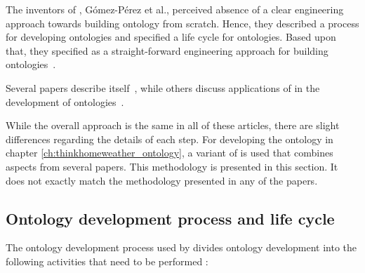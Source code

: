 \vspace{1em}

The inventors of \methontology, Gómez-Pérez et al., perceived absence of a clear engineering approach towards building ontology from scratch. Hence, they described a process for developing ontologies and specified a life cycle for ontologies. Based upon that, they specified \methontology as a straight-forward engineering approach for building ontologies~\cite{Methontology}.

Several papers describe \methontology itself~\cite{Methontology,Methontology2,ORSD}, while others discuss applications of \methontology in the development of ontologies~\cite{MethontologyLegal,MethontologyChemical}.

While the overall approach is the same in all of these articles, there are slight differences regarding the details of each step. For developing the \thinkhomeweather ontology in chapter \ref{ch:thinkhomeweather_ontology}, a variant of \methontology is used that combines aspects from several papers. This methodology is presented in this section. It does not exactly match the methodology presented in any of the papers.



\subsection{Ontology development process and life cycle}

The ontology development process used by \methontology divides ontology development into the following activities that need to be performed \cite{Methontology}:

